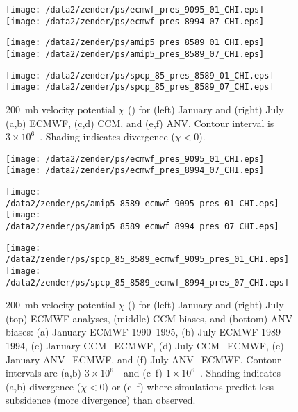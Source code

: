 \documentclass[twocolumn,final]{article}
\begin{document}
\begin{figure*}
\begin{center}
\texttt{[image: /data2/zender/ps/ecmwf\_pres\_9095\_01\_CHI.eps]}%
\texttt{[image: /data2/zender/ps/ecmwf\_pres\_8994\_07\_CHI.eps]}%

\texttt{[image: /data2/zender/ps/amip5\_pres\_8589\_01\_CHI.eps]}%
\texttt{[image: /data2/zender/ps/amip5\_pres\_8589\_07\_CHI.eps]}%

\texttt{[image: /data2/zender/ps/spcp\_85\_pres\_8589\_01\_CHI.eps]}%
\texttt{[image: /data2/zender/ps/spcp\_85\_pres\_8589\_07\_CHI.eps]}%
\end{center}
\caption[200~mb velocity potential $\chi$ for January and
July ECMWF, CCM, and ANV]{
200~mb velocity potential $\chi$ (\mSxs) for (left) January and
(right) July (a,b) ECMWF, (c,d) CCM, and (e,f) ANV.
Contour interval is $3 \times 10^6$~\mSxs. 
Shading indicates divergence ($\chi < 0$).
\label{fig:pres_8589_CHI}}
\end{figure*}
\clearpage

\begin{figure*}
\begin{center}
\texttt{[image: /data2/zender/ps/ecmwf\_pres\_9095\_01\_CHI.eps]}%
\texttt{[image: /data2/zender/ps/ecmwf\_pres\_8994\_07\_CHI.eps]}%

\texttt{[image: /data2/zender/ps/amip5\_8589\_ecmwf\_9095\_pres\_01\_CHI.eps]}%
\texttt{[image: /data2/zender/ps/amip5\_8589\_ecmwf\_8994\_pres\_07\_CHI.eps]}%

\texttt{[image: /data2/zender/ps/spcp\_85\_8589\_ecmwf\_9095\_pres\_01\_CHI.eps]}%
\texttt{[image: /data2/zender/ps/spcp\_85\_8589\_ecmwf\_8994\_pres\_07\_CHI.eps]}%
\end{center}
\caption[200~mb velocity potential $\chi$ for January
and July ECMWF analyses, CCM biases, and ANV biases]{
200~mb velocity potential $\chi$ (\mSxs) for (left) January
and (right) July (top) ECMWF analyses, (middle) CCM biases, and (bottom)
ANV biases: (a) January ECMWF 1990--1995, (b) July ECMWF 1989-1994,
(c) January CCM$-$ECMWF, (d) July CCM$-$ECMWF, (e) January
ANV$-$ECMWF, and (f) July ANV$-$ECMWF.
Contour intervals are (a,b) $3 \times 10^6$~\mSxs\ and (c--f) $1
\times 10^6$~\mSxs.
Shading indicates (a,b) divergence ($\chi < 0$) or (c--f) where
simulations predict less subsidence (more divergence) than observed.
\label{fig:pres_8589_CHI}}   
\end{figure*}
\clearpage
\end{document}
